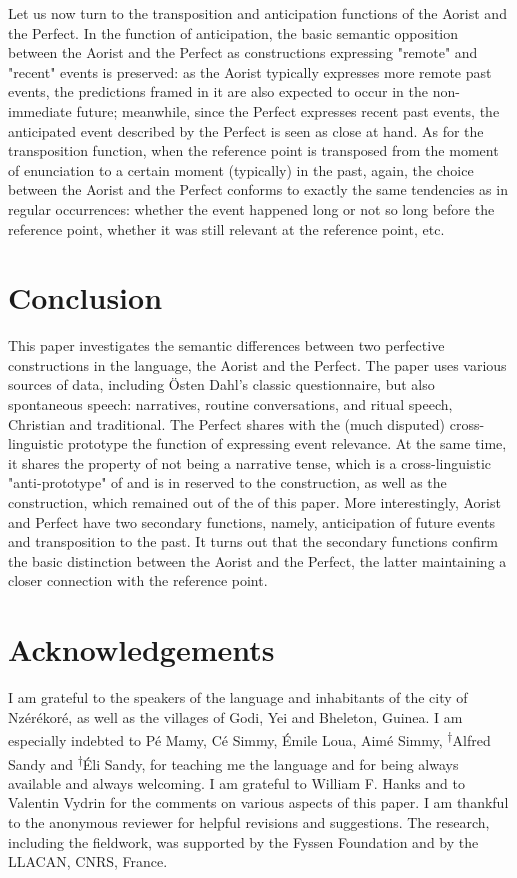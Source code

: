 \documentclass[output=paper]{LSP/langsci}
\begin{document}
Let us now turn to the transposition and anticipation functions of the Aorist and the Perfect. In the function of anticipation, the basic semantic opposition between the Aorist and the Perfect as constructions expressing "remote" and "recent" events is preserved: as the Aorist typically expresses more remote past events, the predictions framed in it are also expected to occur in the non-immediate future; meanwhile, since the Perfect expresses recent past events, the anticipated event described by the Perfect is seen as close at hand. As for the transposition function, when the reference point is transposed from the moment of enunciation to a certain moment (typically) in the past, again, the choice between the Aorist and the Perfect conforms to exactly the same tendencies as in regular occurrences: whether the  event happened long or not so long before the reference point, whether it was still relevant at the reference point, etc.

\section{Conclusion}
This paper investigates the semantic differences between two perfective constructions in the  language, the Aorist and the Perfect. The paper uses various sources of data, including Östen Dahl's classic questionnaire, but also spontaneous speech: narratives, routine conversations, and ritual speech, Christian and traditional. The  Perfect shares with the (much disputed) cross-linguistic prototype the function of expressing event relevance. At the same time, it shares the property of not being a narrative tense, which is a cross-linguistic "anti-prototype" of  and is in  reserved to the  construction, as well as the  construction, which remained out of the  of this paper. More interestingly,  Aorist and Perfect have two secondary functions, namely, anticipation of future events and transposition to the past. It turns out that the secondary functions confirm the basic distinction between the Aorist and the Perfect, the latter maintaining a closer connection with the reference point.


\section*{Acknowledgements}

I am grateful to the speakers of the  language and inhabitants of the city of Nzérékoré, as well as the villages of Godi, Yei and Bheleton, Guinea. I am especially indebted to Pé Mamy, Cé Simmy, Émile Loua, Aimé Simmy, \textsuperscript{†}Alfred Sandy and \textsuperscript{†}Éli Sandy, for teaching me the language and for being always available and always welcoming. I am grateful to William F. Hanks and to Valentin Vydrin for the comments on various aspects of this paper. I am thankful to the anonymous reviewer for helpful revisions and suggestions. The research, including the fieldwork, was supported by the Fyssen Foundation and by the LLACAN, CNRS, France.
\end{document}
